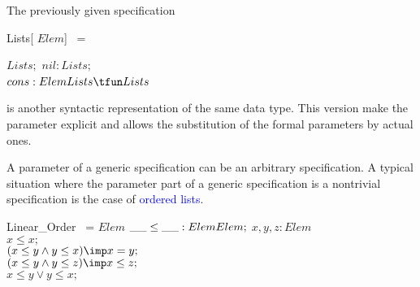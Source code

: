 \documentclass[landscape, autoslides, light]{mmiss}
\begin{document}
\begin{Package}[Label={FSDPT}, Title={Formal Specification of Data and Process Types}, ShortTitle={FSDPT}, Authors={Horst Reichel}, Date={February 2003}, LevelOfDetail=Lecture, Language=en-GB]
\begin{Section}[Title={Initial Algebras as Data Types}, Label={section3}]
\begin{Section}[Title={Generic Specifications}, Label={section3_4}]
\begin{Paragraph}[Label=Paragraph61]
The previously given specification
\begin{SpecDefn}{Lists}[\Sort \hspace{1pt} \(Elem\)] ~=
 \item[\Free~\Group]
\begin{Items}
\I\Sort \(Lists;\) \I\Ops \(nil : Lists; \)
\\ \( cons : Elem \* Lists \tfun Lists \)
 ~\EndGroup \end{Items}  \item[\End]
\end{SpecDefn}
is another syntactic representation of the same data type. This
version make the parameter explicit and allows the substitution of
the formal parameters by actual ones.


\end{Paragraph}
\begin{Paragraph}[Title={Ordered Lists}, Label=Paragraph62]

A parameter of a generic specification can be an arbitrary
specification. A typical situation where the parameter part of a
generic specification is a nontrivial specification is the case of
\textcolor{blue}{ordered lists}. \footnotesize
\begin{SpecDefn}{Linear\_Order} ~=
\I\Sort \(Elem \) \I\Pred \( \_\_ \leq \_\_ : Elem \* Elem;\)
\I\Vars \( x,y,z:  Elem \) \I\Axioms~
\\ \( x \leq x; \)
\\ \( ( x \leq y \wedge y \leq x ) \imp x = y; \)
\\ \( (x \leq y \wedge y \leq z ) \imp x \leq z; \)
\\ \( x \leq y \vee y \leq x ;\)
\I\End \end{SpecDefn}




\end{Paragraph}
\end{Section}
\end{Section}
\end{Package}
\end{document}
